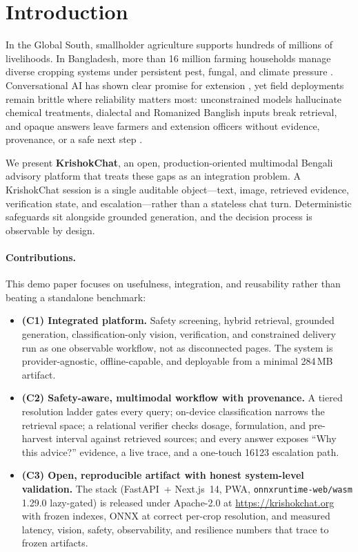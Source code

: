 \section{Introduction}
\label{sec:introduction}

In the Global South, smallholder agriculture supports hundreds of millions of livelihoods. In Bangladesh, more than 16 million farming households manage diverse cropping systems under persistent pest, fungal, and climate pressure \citep{bari_handbook2023}. Conversational AI has shown clear promise for extension \citep{farmerchat2024, krishokbondhu2025}, yet field deployments remain brittle where reliability matters most: unconstrained models hallucinate chemical treatments, dialectal and Romanized Banglish inputs break retrieval, and opaque answers leave farmers and extension officers without evidence, provenance, or a safe next step \citep{ragvue2025}.

We present \textbf{KrishokChat}, an open, production-oriented multimodal Bengali advisory platform that treats these gaps as an integration problem. A KrishokChat session is a single auditable object---text, image, retrieved evidence, verification state, and escalation---rather than a stateless chat turn. Deterministic safeguards sit alongside grounded generation, and the decision process is observable by design.

\paragraph{Contributions.} This demo paper focuses on usefulness, integration, and reusability rather than beating a standalone benchmark:
\begin{itemize}
    \item \textbf{(C1) Integrated platform.} Safety screening, hybrid retrieval, grounded generation, classification-only vision, verification, and constrained delivery run as one observable workflow, not as disconnected pages. The system is provider-agnostic, offline-capable, and deployable from a minimal 284\,MB artifact.
    \item \textbf{(C2) Safety-aware, multimodal workflow with provenance.} A tiered resolution ladder gates every query; on-device classification narrows the retrieval space; a relational verifier checks dosage, formulation, and pre-harvest interval against retrieved sources; and every answer exposes ``Why this advice?'' evidence, a live trace, and a one-touch 16123 escalation path.
    \item \textbf{(C3) Open, reproducible artifact with honest system-level validation.} The stack (FastAPI~+ Next.js~14, PWA, \texttt{onnxruntime-web/wasm} 1.29.0 lazy-gated) is released under Apache-2.0 at \url{https://krishokchat.org} with frozen indexes, ONNX at correct per-crop resolution, and measured latency, vision, safety, observability, and resilience numbers that trace to frozen artifacts.
\end{itemize}
